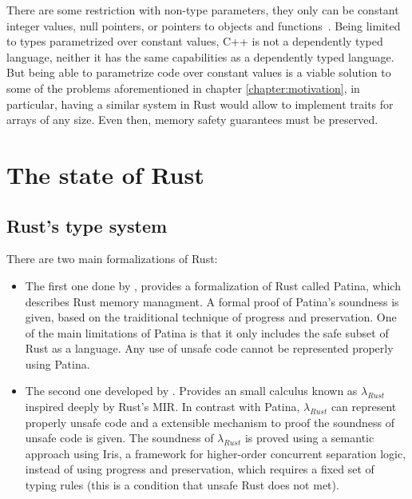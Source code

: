 There are some restriction with non-type parameters, they only can be constant
integer values, null pointers, or pointers to objects and
functions~\cite{templates}. Being limited to types parametrized over constant
values, C++ is not a dependently typed language, neither it has the same
capabilities as a dependently typed language. But being able to parametrize code
over constant values is a viable solution to some of the problems aforementioned
in chapter \ref{chapter:motivation}, in particular, having a similar system in
Rust would allow to implement traits for arrays of any size. Even then, memory
safety guarantees must be preserved.

\section{The state of Rust} 

\subsection{Rust's type system}

There are two main formalizations of Rust: 

\begin{itemize} 
    
    \item The first one done by \citet{reed}, provides a formalization of Rust
        called Patina, which describes Rust memory managment. A formal proof of
        Patina's soundness is given, based on the traiditional technique of
        progress and preservation. One of the main limitations of Patina is that
        it only includes the safe subset of Rust as a language. Any use of
        unsafe code cannot be represented properly using Patina.

    \item The second one developed by \citet{ralf}. Provides an small calculus
        known as $\lambda_{Rust}$ inspired deeply by Rust's MIR. In contrast
        with Patina, $\lambda_{Rust}$ can represent properly unsafe code and a
        extensible mechanism to proof the soundness of unsafe code is given. The
        soundness of $\lambda_{Rust}$ is proved using a semantic approach using
        Iris, a framework for higher-order concurrent separation logic, instead
        of using progress and preservation, which requires a fixed set of typing
        rules (this is a condition that unsafe Rust does not met).
        
\end{itemize}

